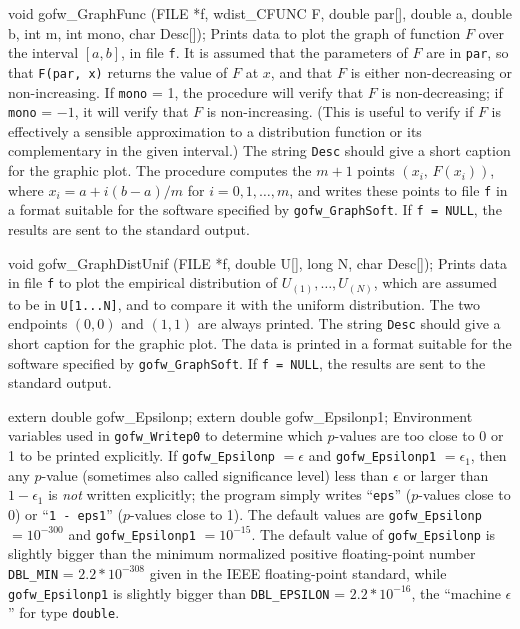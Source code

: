 void gofw_GraphFunc (FILE *f, wdist_CFUNC F, double par[], double a,
                     double b, int m, int mono, char Desc[]);
\endcode
 \tab
  Prints data to plot the graph of function $F$ over the interval $[a,b]$,
  in file {\tt f}.  It is assumed that the parameters of $F$ are in
  {\tt par}, so that {\tt F(par, x)} returns the value of $F$ at $x$,
  and that $F$ is either non-decreasing or non-increasing.
  If {\tt mono} = 1, the procedure will verify that $F$ is non-decreasing;
  if {\tt mono} = $-1$, it will verify that $F$ is non-increasing.
  (This is useful to verify if $F$ is effectively a sensible
  approximation to a distribution function or its complementary
  in the given interval.)
  The string {\tt Desc} should give a short caption for the graphic plot.
  The procedure computes the $m+1$ points $(x_i,\, F(x_i))$,
  where $x_i = a + i(b-a)/m$ for $i=0,1,\ldots,m$, and writes these points
  to file {\tt f} in a format suitable for the
  software specified by {\tt gofw\_GraphSoft}.
  If {\tt f = NULL}, the results are sent to the standard output.
 \endtab
\code


void gofw_GraphDistUnif (FILE *f, double U[], long N, char Desc[]);
\endcode
 \tab  Prints data in file {\tt f} to plot the empirical distribution of
  $U_{(1)},\dots,U_{(N)}$, which are assumed to be in {\tt U[1...N]},
  and to compare it with the uniform distribution.
  The two endpoints $(0, 0)$ and $(1, 1)$ are always printed.
  The string {\tt Desc} should give a short caption for the graphic plot.
  The data is printed in a format suitable for the
  software specified by {\tt gofw\_GraphSoft}.
  If {\tt f = NULL}, the results are sent to the standard output.
 \endtab



\code

extern double gofw_Epsilonp;
extern double gofw_Epsilonp1;
\endcode
 \tab  Environment variables used in {\tt gofw\_Writep0} to determine
   which $p$-values are too close to 0 or 1 to be printed explicitly.
   If {\tt gofw\_Epsilonp} $= \epsilon$ and
      {\tt gofw\_Epsilonp1} $= \epsilon_1$, then any $p$-value
   (sometimes also called significance level) less than $\epsilon$ or larger than
   $1-\epsilon_1$ is {\em not\/} written explicitly;
   the program simply writes ``{\tt eps}'' ($p$-values close to 0)
   or ``{\tt 1 - eps1}'' ($p$-values close to 1).
   The default values are {\tt gofw\_Epsilonp} $ =10^{-300}$ and
  {\tt gofw\_Epsilonp1} $= 10^{-15}$.
  The default value of {\tt gofw\_Epsilonp} is slightly bigger than
  the minimum normalized positive floating-point number
 {\tt DBL\_MIN} = $2.2*10^{-308}$ given in the IEEE floating-point standard,
  while {\tt gofw\_Epsilonp1} is slightly bigger than
  {\tt DBL\_EPSILON} = $2.2*10^{-16}$, the  ``machine $\epsilon$''
  for type {\tt double}.
 \endtab
\code



